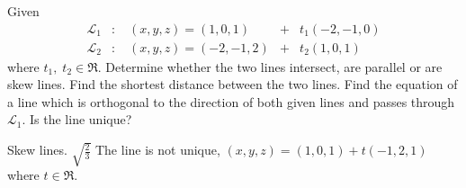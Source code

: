 
\begin{Exercise}[
name={},
title={}, 
difficulty=0,
origin={\cite{YL}}]
Given 
\[
\begin{array}{lllllllll}
\mathcal{L}_1 & : & \; (x, y, z)=(1, 0, 1) & + & t_1 (-2,-1,0)\\
\mathcal{L}_2 & : & \; (x, y, z)=(-2, -1, 2) & + & t_2 (1,0,1) 
\end{array}
\]
where $t_1,\;t_2\in\Re$.
\Question Determine whether the two lines intersect, are parallel or are skew lines.
\Question Find the shortest distance between the two lines.
\Question Find the equation of a line which is orthogonal to the direction of both given lines and passes through $\mathcal{L}_1$.  Is the line unique?
\end{Exercise}
\begin{Answer}
\Question Skew lines.
\Question $\sqrt{\frac23}$
\Question The line is not unique, $(x,y,z)=(1,0,1)+t(-1,2,1)$ where $t\in\Re$.
\end{Answer}
